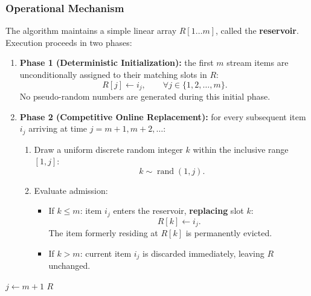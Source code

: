 \subsubsection{Operational Mechanism}
The algorithm maintains a simple linear array $R[1 \dots m]$, called the \textbf{reservoir}. Execution proceeds in two phases:
\begin{enumerate}
  \item \textbf{Phase 1 (Deterministic Initialization):} the first $m$ stream items are unconditionally assigned to their matching slots in $R$:
  \begin{equation}
    R[j] \leftarrow i_j, \qquad \forall j \in \{1, 2, \dots, m\}.
  \end{equation}
  No pseudo-random numbers are generated during this initial phase.
  \item \textbf{Phase 2 (Competitive Online Replacement):} for every subsequent item $i_j$ arriving at time $j = m + 1, m + 2, \dots$:
  \begin{enumerate}
    \item Draw a uniform discrete random integer $k$ within the inclusive range $[1, j]$:
    \begin{equation}
      k \sim \operatorname{rand}(1, j).
    \end{equation}
    \item Evaluate admission:
    \begin{itemize}
      \item If $k \le m$: item $i_j$ enters the reservoir, \textbf{replacing} slot $k$:
      \begin{equation}
        R[k] \leftarrow i_j.
      \end{equation}
      The item formerly residing at $R[k]$ is permanently evicted.
      \item If $k > m$: current item $i_j$ is discarded immediately, leaving $R$ unchanged.
    \end{itemize}
  \end{enumerate}
\end{enumerate}

\begin{algorithm}[H]
  \caption{Reservoir Sampling (Algorithm R by Waterman / Knuth)}
  \label{alg:reservoir-sampling-stream}
  $j \leftarrow m + 1$\;
  \Return $R$\;
\end{algorithm}

